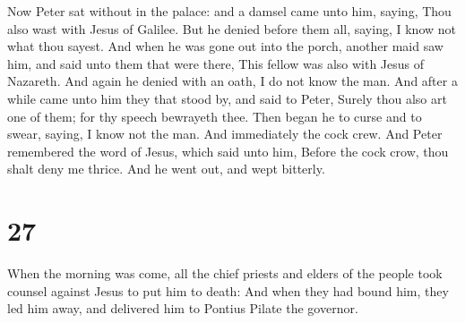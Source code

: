  Now Peter sat without in the palace: and a damsel came
unto him, saying, Thou also wast with Jesus of Galilee. 
But he denied before them all, saying, I know not what thou sayest.
 And when he was gone out into the porch, another maid
saw him, and said unto them that were there, This fellow was also with
Jesus of Nazareth.  And again he denied with an oath, I
do not know the man.  And after a while came unto him
they that stood by, and said to Peter, Surely thou also art one of them;
for thy speech bewrayeth thee.  Then began he to curse
and to swear, saying, I know not the man. And immediately the cock crew.
 And Peter remembered the word of Jesus, which said unto
him, Before the cock crow, thou shalt deny me thrice. And he went out,
and wept bitterly.

\hypertarget{section-26}{%
\section{27}\label{section-26}}

 When the morning was come, all the chief priests and
elders of the people took counsel against Jesus to put him to death:
 And when they had bound him, they led him away, and
delivered him to Pontius Pilate the governor.

